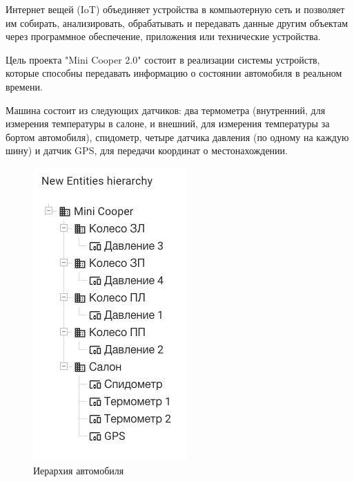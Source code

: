 
    Интернет вещей (IoT) объединяет устройства в компьютерную сеть и позволяет им собирать, анализировать, обрабатывать и передавать данные другим объектам через программное обеспечение, приложения или технические устройства.

    
    Цель проекта "Mini Cooper 2.0" состоит в реализации системы устройств, которые способны передавать информацию о состоянии автомобиля в реальном времени.
    
    Машина состоит из следующих датчиков: два термометра (внутренний, для измерения температуры в салоне, и внешний, для измерения температуры за бортом автомобиля), спидометр, четыре датчика давления (по одному на каждую шину) и датчик GPS, для передачи координат о местонахождении.
    
    
    \begin{figure}[!ht]
		\centering
		\includegraphics[scale=0.8]{pictures/5.jpg}
		\caption{Иерархия автомобиля}
		\label{fig1}
	\end{figure}